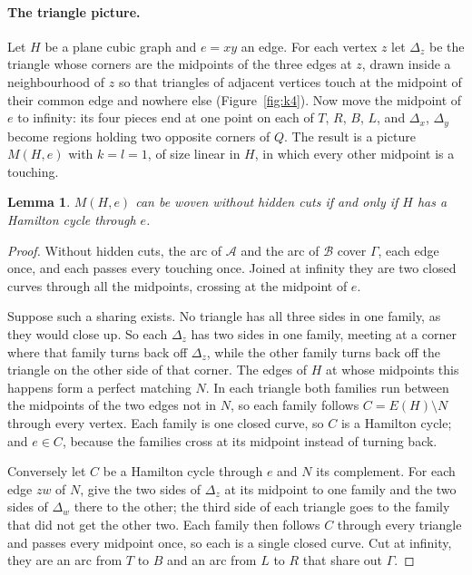 \documentclass[11pt,a4paper]{article}
\newtheorem{lemma}[theorem]{Lemma}
\theoremstyle{definition}
\theoremstyle{remark}
\newcommand{\A}{\mathcal{A}}
\newcommand{\B}{\mathcal{B}}
\begin{document}
\paragraph{The triangle picture.}
Let $H$ be a plane cubic graph and $e=xy$ an edge. For each vertex $z$ let
$\Delta_z$ be the triangle whose corners are the midpoints of the three
edges at $z$, drawn inside a neighbourhood of $z$ so that triangles of
adjacent vertices touch at the midpoint of their common edge and nowhere
else (Figure~\ref{fig:k4}). Now move the midpoint of $e$ to infinity: its
four pieces end at one point on each of $T$, $R$, $B$, $L$, and
$\Delta_x$, $\Delta_y$ become regions holding two opposite corners of
$Q$. The result is a picture $M(H,e)$ with $k=l=1$, of size linear in $H$,
in which every other midpoint is a touching.

\begin{lemma}\label{lem:claim}
$M(H,e)$ can be woven without hidden cuts if and only if $H$ has a
Hamilton cycle through $e$.
\end{lemma}
\begin{proof}
Without hidden cuts, the arc of $\A$ and the arc of $\B$ cover $\Gamma$,
each edge once, and each passes every touching once. Joined at infinity
they are two closed curves through all the midpoints, crossing at the
midpoint of $e$.

Suppose such a sharing exists. No triangle has all three sides in one
family, as they would close up. So each $\Delta_z$ has two sides in one
family, meeting at a corner where that family turns back off $\Delta_z$,
while the other family turns back off the triangle on the other side of
that corner. The edges of $H$ at whose midpoints this happens form a
perfect matching $N$. In each triangle both families run between the
midpoints of the two edges not in $N$, so each family follows
$C=E(H)\setminus N$ through every vertex. Each family is one closed curve,
so $C$ is a Hamilton cycle; and $e\in C$, because the families cross at its
midpoint instead of turning back.

Conversely let $C$ be a Hamilton cycle through $e$ and $N$ its complement.
For each edge $zw$ of $N$, give the two sides of $\Delta_z$ at its midpoint
to one family and the two sides of $\Delta_w$ there to the other; the third
side of each triangle goes to the family that did not get the other two.
Each family then follows $C$ through every triangle and passes every
midpoint once, so each is a single closed curve. Cut at infinity, they are
an arc from $T$ to $B$ and an arc from $L$ to $R$ that share out $\Gamma$.
\end{proof}
\end{document}
